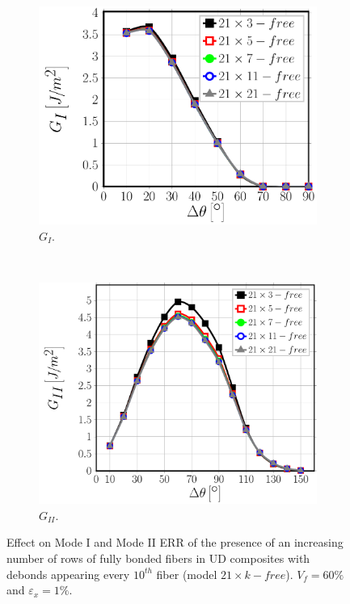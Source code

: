 \begin{figure}[!h]
\centering
    \begin{subfigure}[b]{0.45\textwidth}
        \includegraphics[width=\textwidth]{paperB/sideabovefibers-vf60-GI.pdf}
        \caption{$G_{I}$.}\label{paperB:subfig:sideabovefiber60MIsp}
    \end{subfigure} ~
    \begin{subfigure}[b]{0.45\textwidth}
        \includegraphics[width=\textwidth]{paperB/sideabovefibers-vf60-GII.pdf}
        \caption{$G_{II}$.}\label{paperB:subfig:sideabovefiber60MIIsp}
    \end{subfigure}

\caption{Effect on Mode I and Mode II ERR of the presence of an increasing number of rows of fully bonded fibers in UD composites with debonds appearing every $10^{th}$ fiber (model $21\times k-free$). $V_{f}=60\%$ and $\varepsilon_{x}=1\%$.}\label{paperB:fig:sideabovefibersspacingfixed}
\end{figure}

